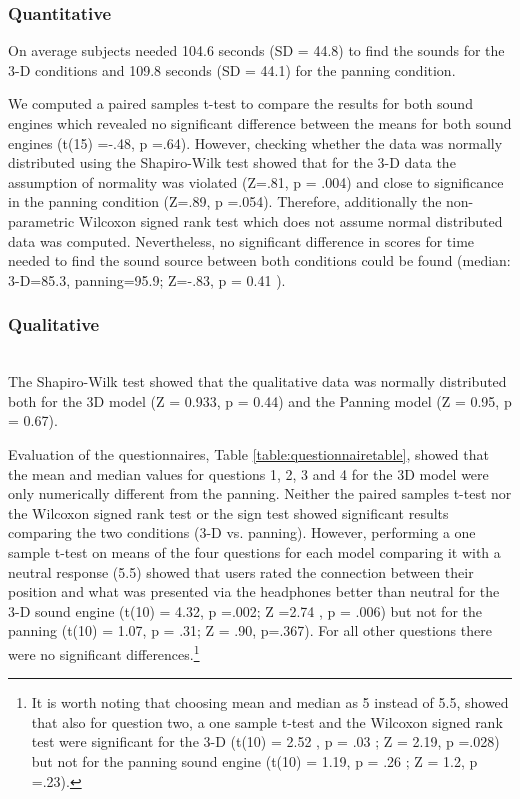 \documentclass[journal]{IEEEtran}
\begin{document}
\subsubsection{Quantitative}
On average subjects needed 104.6 seconds (SD = 44.8) to find the sounds for the 3-D conditions and 109.8 seconds (SD = 44.1) for the panning condition. 

We computed a paired samples t-test to compare the results for both sound engines which revealed no significant difference between the means for both sound engines (t(15) =-.48, p =.64). However, checking whether the data was normally distributed using the Shapiro-Wilk test showed that for the 3-D data the assumption of normality was violated (Z=.81, p = .004) and close to significance in the panning condition (Z=.89, p =.054). Therefore, additionally the non-parametric Wilcoxon signed rank test which does not assume normal distributed data was computed. Nevertheless, no significant difference in scores for time needed to find the sound source between both conditions could be found (median: 3-D=85.3, panning=95.9; Z=-.83, p = 0.41 ). 

\subsubsection{Qualitative}~\\
The Shapiro-Wilk test showed that the qualitative data was normally distributed both for the 3D model (Z = 0.933, p = 0.44) and the Panning model (Z = 0.95, p = 0.67). 

Evaluation of the questionnaires, Table \ref{table:questionnairetable}, showed that the mean and median values for questions 1, 2, 3 and 4 for the 3D model were only numerically different from the panning. Neither the paired samples t-test nor the Wilcoxon signed rank test or the sign test showed significant results comparing the two conditions (3-D vs. panning). However, performing a one sample t-test on means of the four questions for each model comparing it with a neutral response (5.5) showed that users rated the connection between their position and what was presented via the headphones better than neutral for the 3-D sound engine (t(10) = 4.32, p =.002; Z =2.74 , p = .006) but not for the panning (t(10) = 1.07, p = .31; Z = .90, p=.367). For all other questions there were no significant differences.\footnote{It is worth noting that choosing mean and median as 5 instead of 5.5, showed that also for question two, a one sample t-test and the Wilcoxon signed rank test were significant for the 3-D (t(10) = 2.52 , p = .03 ; Z = 2.19, p =.028) but not for the panning sound engine (t(10) = 1.19, p = .26 ; Z = 1.2, p =.23).}
\end{document}
